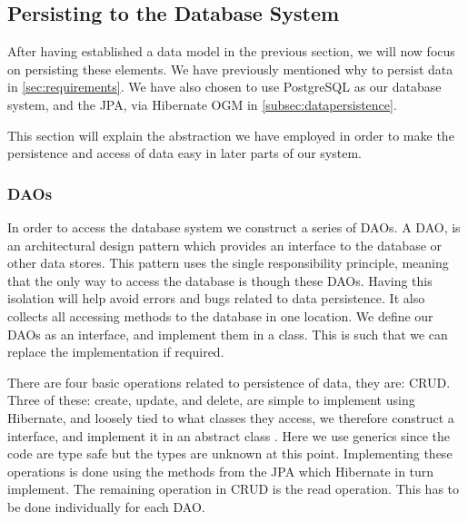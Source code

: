 \subsection{Persisting to the Database System}\label{subsec:persistingtodb}

After having established a data model in the previous section, we will now focus on persisting these elements.
We have previously mentioned why to persist data in \cref{sec:requirements}.
We have also chosen to use PostgreSQL as our database system, and the \ac{JPA}, via Hibernate OGM in \cref{subsec:datapersistence}.

This section will explain the abstraction we have employed in order to make the persistence and access of data easy in later parts of our system.

\subsubsection*{\acp{DAO}}
In order to access the database system we construct a series of \acp{DAO}.
A \ac{DAO}, is an architectural design pattern which provides an interface to the database or other data stores\cite{oracle_dao}.
This pattern uses the single responsibility principle, meaning that the only way to access the database is though these \acp{DAO}.
Having this isolation will help avoid errors and bugs related to data persistence.
It also collects all accessing methods to the database in one location.
We define our \acp{DAO} as an interface, and implement them in a class.
This is such that we can replace the implementation if required. 

There are four basic operations related to persistence of data, they are: \ac{CRUD}.
Three of these: create, update, and delete, are simple to implement using Hibernate, and loosely tied to what classes they access, we therefore construct a  interface, and implement it in an abstract class .
Here we use generics since the code are type safe but the types are unknown at this point.
Implementing these operations is done using the methods from the \ac{JPA} which Hibernate in turn implement.
The remaining operation in \ac{CRUD} is the read operation.
This has to be done individually for each \ac{DAO}.

